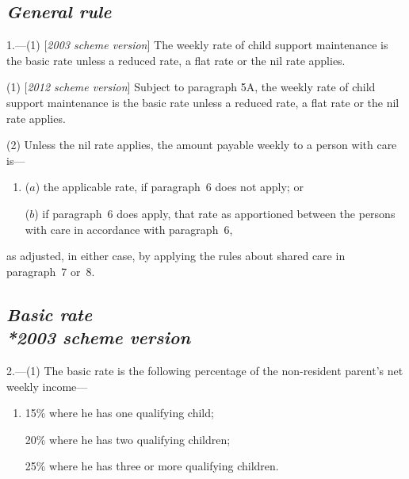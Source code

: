 \documentclass[12pt,a4paper]{article}
\begin{document}

\subsection*{\itshape General rule}

1.---(1) [\emph{2003 scheme version}] The weekly rate of child support maintenance is the basic rate unless a reduced rate, a flat rate or the nil rate applies.

(1) [\emph{2012 scheme version}]
Subject to paragraph 5A,  %
the weekly rate of child support maintenance is the basic rate unless a reduced rate, a flat rate or the nil rate applies.

(2) Unless the nil rate applies, the amount payable weekly to a person with care is—
\begin{enumerate}\item[]
($a$) the applicable rate, if paragraph~6 does not apply; or

($b$) if paragraph~6 does apply, that rate as apportioned between the persons with care in accordance with paragraph~6,
\end{enumerate}
as adjusted, in either case, by applying the rules about shared care in paragraph~7 or~8. 


\subsection*{\itshape Basic rate\\*\emph{2003 scheme version}}

2.---(1) The basic rate is the following percentage of the non-resident parent’s net weekly income—
\begin{enumerate}\item[]
    15\% where he has one qualifying child;

    20\% where he has two qualifying children;

    25\% where he has three or more qualifying children. 
\end{enumerate}
\end{document}
